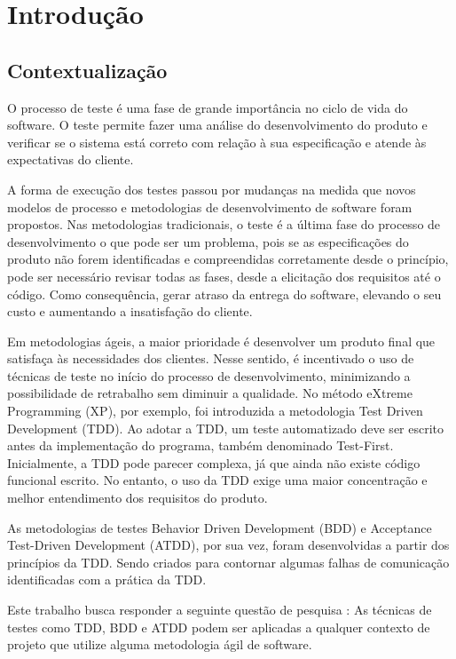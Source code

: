 \chapter{Introdução}\label{CAP:introducao}
\section{Contextualização}
O processo de teste é uma fase de grande importância no ciclo de vida do software. O teste permite fazer uma análise do desenvolvimento do produto e verificar se o sistema está correto com relação à sua especificação e atende às expectativas do cliente. 

A forma de execução dos testes passou por mudanças na medida que novos modelos de processo e metodologias de desenvolvimento de software foram propostos. Nas metodologias tradicionais, o teste é a última fase do processo de desenvolvimento o que pode ser um problema, pois se as especificações do produto não forem identificadas e compreendidas corretamente desde o princípio, pode ser necessário revisar todas as fases, desde a elicitação dos requisitos até o código. Como consequência, gerar atraso da entrega do software, elevando o seu custo e aumentando a insatisfação do cliente. 

Em metodologias ágeis, a maior prioridade é desenvolver um produto final que satisfaça às necessidades dos clientes. Nesse sentido, é incentivado o uso de técnicas de teste no início do processo de desenvolvimento, minimizando a possibilidade de retrabalho sem diminuir a qualidade. 
No método eXtreme Programming (XP), por exemplo, foi introduzida a metodologia Test Driven Development (TDD). Ao adotar a TDD, um teste automatizado deve ser escrito antes da implementação do programa, também denominado Test-First. Inicialmente, a TDD pode parecer complexa, já que ainda não existe código funcional escrito. No entanto, o uso da TDD exige uma maior concentração e melhor entendimento dos requisitos do produto. 

As metodologias de testes Behavior Driven Development (BDD) e Acceptance Test-Driven Development (ATDD), por sua vez, foram desenvolvidas a partir dos princípios da TDD. Sendo criados para contornar algumas falhas de comunicação identificadas com a prática da TDD.

Este trabalho busca responder a seguinte questão de pesquisa : As técnicas de testes como TDD, BDD e ATDD podem ser aplicadas a qualquer contexto de projeto que utilize alguma metodologia ágil de software.


